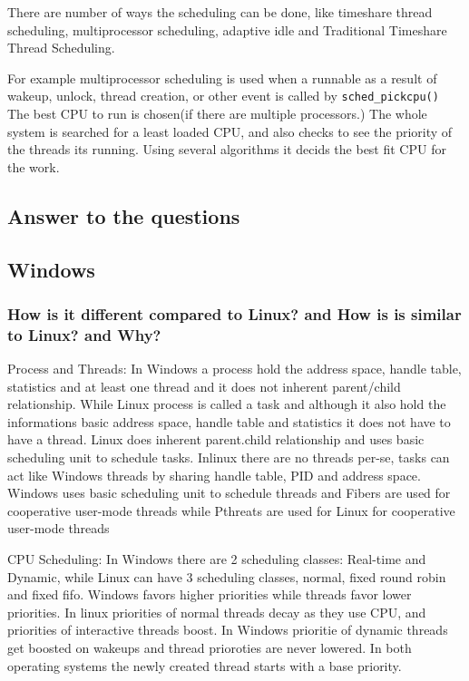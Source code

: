 \documentclass[letterpaper,10pt,draftclsnofoot,onecolumn]{IEEEtran}
\begin{document}
There are number of ways the scheduling can be done, like timeshare thread scheduling, multiprocessor scheduling, adaptive idle and Traditional Timeshare Thread Scheduling.

For example multiprocessor scheduling is used when a runnable as a result of wakeup, unlock, thread creation, or other event is called by \verb|sched_pickcpu()| The best CPU to run is chosen(if there are multiple processors.) The whole system is searched for a least loaded CPU, and also checks to see the priority of the threads its running. Using several algorithms it decids the best fit CPU for the work.

\subsection*{Answer to the questions}
\subsection*{Windows}
\subsubsection*{How is it different compared to Linux? and How is is similar to Linux? and Why?}

Process and Threads: In Windows a process hold the address space, handle table, statistics and at least one thread and it does not inherent parent/child relationship. While Linux process is called a task and although it also hold the informations basic address space, handle table and statistics it does not have to have a thread. Linux does inherent parent.child relationship and uses basic scheduling unit to schedule tasks. Inlinux there are no threads per-se, tasks can act like Windows threads by sharing handle table, PID and address space. Windows uses basic scheduling unit to schedule threads and Fibers are used for cooperative user-mode threads while Pthreats are used for Linux for cooperative user-mode threads

CPU Scheduling: In Windows there are 2 scheduling classes: Real-time and Dynamic, while Linux can have 3 scheduling classes, normal, fixed round robin and fixed fifo. Windows favors higher priorities while threads favor lower priorities. In linux priorities of normal threads decay as they use CPU,  and priorities of interactive threads boost. In Windows prioritie of dynamic threads get boosted on wakeups and thread prioroties are never lowered. In both operating systems the newly created thread starts with a base priority.
\end{document}
